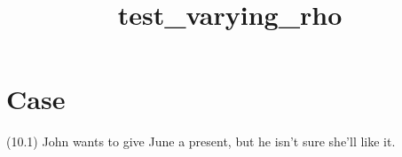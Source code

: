 \documentclass{article}
\begin{document}
%
%

\title{\textbf{test\_varying\_rho}}
\maketitle

%
%

\section*{Case }

\bigbreak
\begin{enumerate*}
\item[(10.1)] John wants to give June a present, but he isn't sure she’ll like it.
\end{enumerate*}
\bigbreak
\end{document}

